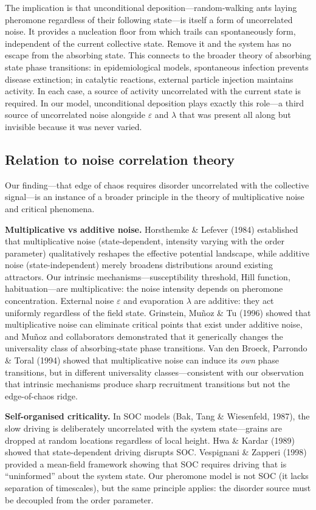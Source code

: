 \documentclass[11pt,a4paper]{article}
\begin{document}
The implication is that unconditional deposition---random-walking ants laying pheromone regardless of their following state---is itself a form of uncorrelated noise.
It provides a nucleation floor from which trails can spontaneously form, independent of the current collective state.
Remove it and the system has no escape from the absorbing state.
This connects to the broader theory of absorbing state phase transitions: in epidemiological models, spontaneous infection prevents disease extinction; in catalytic reactions, external particle injection maintains activity.
In each case, a source of activity uncorrelated with the current state is required.
In our model, unconditional deposition plays exactly this role---a third source of uncorrelated noise alongside $\varepsilon$ and $\lambda$ that was present all along but invisible because it was never varied.

\subsection{Relation to noise correlation theory}

Our finding---that edge of chaos requires disorder uncorrelated with the collective signal---is an instance of a broader principle in the theory of multiplicative noise and critical phenomena.

\textbf{Multiplicative vs additive noise.}
Horsthemke \& Lefever (1984) established that multiplicative noise (state-dependent, intensity varying with the order parameter) qualitatively reshapes the effective potential landscape, while additive noise (state-independent) merely broadens distributions around existing attractors.
Our intrinsic mechanisms---susceptibility threshold, Hill function, habituation---are multiplicative: the noise intensity depends on pheromone concentration.
External noise $\varepsilon$ and evaporation $\lambda$ are additive: they act uniformly regardless of the field state.
Grinstein, Mu\~noz \& Tu (1996) showed that multiplicative noise can eliminate critical points that exist under additive noise, and Mu\~noz and collaborators demonstrated that it generically changes the universality class of absorbing-state phase transitions.
Van den Broeck, Parrondo \& Toral (1994) showed that multiplicative noise can induce its \emph{own} phase transitions, but in different universality classes---consistent with our observation that intrinsic mechanisms produce sharp recruitment transitions but not the edge-of-chaos ridge.

\textbf{Self-organised criticality.}
In SOC models (Bak, Tang \& Wiesenfeld, 1987), the slow driving is deliberately uncorrelated with the system state---grains are dropped at random locations regardless of local height.
Hwa \& Kardar (1989) showed that state-dependent driving disrupts SOC.
Vespignani \& Zapperi (1998) provided a mean-field framework showing that SOC requires driving that is ``uninformed'' about the system state.
Our pheromone model is not SOC (it lacks separation of timescales), but the same principle applies: the disorder source must be decoupled from the order parameter.
\end{document}
